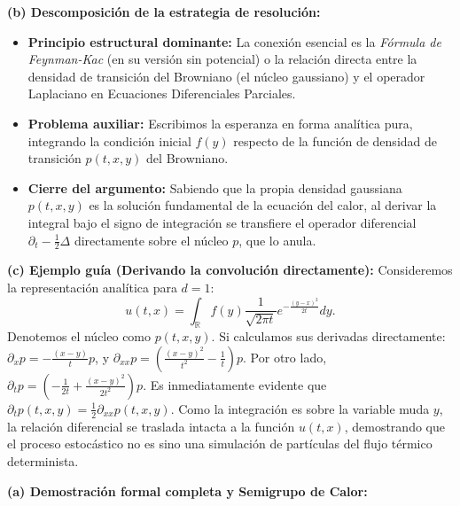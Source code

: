 \documentclass[11pt, letterpaper]{article}
\begin{document}
\begin{solucion}
    \textbf{(b) Descomposición de la estrategia de resolución:}
    \begin{itemize}
        \item[(i)] \textbf{Principio estructural dominante:} La conexión esencial es la \textit{Fórmula de Feynman-Kac} (en su versión sin potencial) o la relación directa entre la densidad de transición del Browniano (el núcleo gaussiano) y el operador Laplaciano en Ecuaciones Diferenciales Parciales.
        \item[(ii)] \textbf{Problema auxiliar:} Escribimos la esperanza en forma analítica pura, integrando la condición inicial $f(y)$ respecto de la función de densidad de transición $p(t, x, y)$ del Browniano.
        \item[(iii)] \textbf{Cierre del argumento:} Sabiendo que la propia densidad gaussiana $p(t,x,y)$ es la solución fundamental de la ecuación del calor, al derivar la integral bajo el signo de integración se transfiere el operador diferencial $\partial_t - \frac{1}{2}\Delta$ directamente sobre el núcleo $p$, que lo anula.
    \end{itemize}

    \vspace{3mm}
    \textbf{(c) Ejemplo guía (Derivando la convolución directamente):}
    Consideremos la representación analítica para $d=1$:
    \[ u(t,x) = \int_{\mathbb{R}} f(y) \frac{1}{\sqrt{2\pi t}} e^{-\frac{(y-x)^2}{2t}} dy. \]
    Denotemos el núcleo como $p(t, x, y)$. Si calculamos sus derivadas directamente:
    $\partial_x p = -\frac{(x-y)}{t} p$, y $\partial_{xx} p = \left( \frac{(x-y)^2}{t^2} - \frac{1}{t} \right) p$.
    Por otro lado, $\partial_t p = \left( -\frac{1}{2t} + \frac{(x-y)^2}{2t^2} \right) p$.
    Es inmediatamente evidente que $\partial_t p(t,x,y) = \frac{1}{2} \partial_{xx} p(t,x,y)$.
    Como la integración es sobre la variable muda $y$, la relación diferencial se traslada intacta a la función $u(t,x)$, demostrando que el proceso estocástico no es sino una simulación de partículas del flujo térmico determinista.

    \vspace{3mm}
    \textbf{(a) Demostración formal completa y Semigrupo de Calor:}


\end{solucion}
\end{document}
